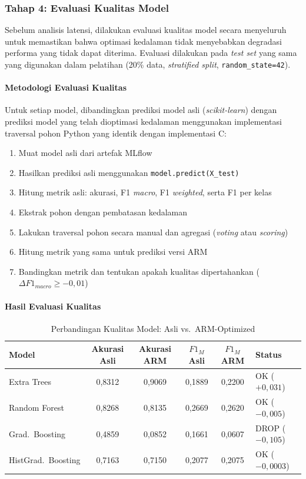 \subsubsection{Tahap 4: Evaluasi Kualitas Model}
\label{subsec:quality_eval}

Sebelum analisis latensi, dilakukan evaluasi kualitas model secara menyeluruh untuk memastikan bahwa optimasi kedalaman tidak menyebabkan degradasi performa yang tidak dapat diterima. Evaluasi dilakukan pada \textit{test set} yang sama yang digunakan dalam pelatihan (20\% data, \textit{stratified split}, \texttt{random\_state=42}).

\paragraph{Metodologi Evaluasi Kualitas}
Untuk setiap model, dibandingkan prediksi model asli (\textit{scikit-learn}) dengan prediksi model yang telah dioptimasi kedalaman menggunakan implementasi traversal pohon Python yang identik dengan implementasi C:

\begin{enumerate}
    \item Muat model asli dari artefak MLflow
    \item Hasilkan prediksi asli menggunakan \texttt{model.predict(X\_test)}
    \item Hitung metrik asli: akurasi, F1 \textit{macro}, F1 \textit{weighted}, serta F1 per kelas
    \item Ekstrak pohon dengan pembatasan kedalaman
    \item Lakukan traversal pohon secara manual dan agregasi (\textit{voting} atau \textit{scoring})
    \item Hitung metrik yang sama untuk prediksi versi ARM
    \item Bandingkan metrik dan tentukan apakah kualitas dipertahankan ($\Delta F1_{macro} \geq -0{,}01$)
\end{enumerate}

\paragraph{Hasil Evaluasi Kualitas}

\begin{table}[htbp]
\centering
\caption{Perbandingan Kualitas Model: Asli vs.\ ARM-Optimized}
\label{tab:quality_comparison}
\begin{tabular}{lccccl}
\hline
\textbf{Model} & \textbf{Akurasi Asli} & \textbf{Akurasi ARM} & \textbf{$F1_M$ Asli} & \textbf{$F1_M$ ARM} & \textbf{Status} \\
\hline
Extra Trees & 0,8312 & 0,9069 & 0,1889 & 0,2200 & OK ($+0{,}031$) \\
Random Forest & 0,8268 & 0,8135 & 0,2669 & 0,2620 & OK ($-0{,}005$) \\
Grad.\ Boosting & 0,4859 & 0,0852 & 0,1661 & 0,0607 & DROP ($-0{,}105$) \\
HistGrad.\ Boosting & 0,7163 & 0,7150 & 0,2077 & 0,2075 & OK ($-0{,}0003$) \\
\hline
\end{tabular}
\end{table}

